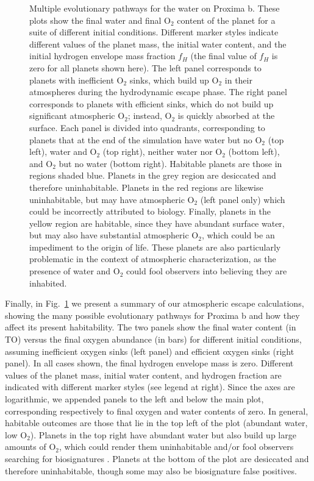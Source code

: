 \documentclass[preprint,12pt]{aastex}
\def\imagebox#1#2{\vtop to #1{\null\hbox{#2}\vfill}} %
\begin{document}
\begin{figure}
\centering
\subfigure{\label{fig:atmesc:synth:a}\imagebox{2.5in}{\texttt{[image: synth\_a.pdf]}}}
\subfigure{\label{fig:atmesc:synth:b}\imagebox{2.5in}{\texttt{[image: synth\_b.pdf]}}}
\subfigure{\label{fig:atmesc:synth:c}\imagebox{2.5in}{\texttt{[image: synth\_c.pdf]}}}
\caption{Multiple evolutionary pathways for the water on Proxima
  b. These plots show the final water and final O$_2$ content of the
  planet for a suite of different initial conditions. Different marker
  styles indicate different values of the planet mass, the initial
  water content, and the initial hydrogen envelope mass fraction $f_H$
  (the final value of $f_H$ is zero for all planets shown here).  The
  left panel corresponds to planets with inefficient O$_2$ sinks,
  which build up O$_2$ in their atmospheres during the hydrodynamic
  escape phase. The right panel corresponds to planets with efficient
  sinks, which do not build up significant atmospheric O$_2$; instead,
  O$_2$ is quickly absorbed at the surface. Each panel is divided into
  quadrants, corresponding to planets that at the end of the
  simulation have water but no O$_2$ (top left), water and O$_2$ (top
  right), neither water nor O$_2$ (bottom left), and O$_2$ but no
  water (bottom right). Habitable planets are those in regions shaded
  blue. Planets in the grey region are desiccated and therefore
  uninhabitable. Planets in the red regions are likewise
  uninhabitable, but may have atmospheric O$_2$ (left panel only)
  which could be incorrectly attributed to biology. Finally, planets
  in the yellow region are habitable, since they have abundant surface
  water, but may also have substantial atmospheric O$_2$, which could
  be an impediment to the origin of life. These planets are also
  particularly problematic in the context of atmospheric
  characterization, as the presence of water and O$_2$ could fool
  observers into believing they are inhabited.}
\label{fig:atmesc:synth}
\end{figure}

Finally, in Fig.~\ref{fig:atmesc:synth} we present a summary of our
atmospheric escape calculations, showing the many possible
evolutionary pathways for Proxima b and how they affect its present
habitability. The two panels show the final water content (in TO)
versus the final oxygen abundance (in bars) for different initial
conditions, assuming inefficient oxygen sinks (left panel) and
efficient oxygen sinks (right panel). In all cases shown, the final
hydrogen envelope mass is zero.  Different values of the planet mass,
initial water content, and hydrogen fraction are indicated with
different marker styles (see legend at right). Since the axes are
logarithmic, we appended panels to the left and below the main plot,
corresponding respectively to final oxygen and water contents of
zero. In general, habitable outcomes are those that lie in the top
left of the plot (abundant water, low O$_2$). Planets in the top right
have abundant water but also build up large amounts of O$_2$, which
could render them uninhabitable and/or fool
observers searching for biosignatures \citep{LugerBarnes15}. Planets at the bottom of the
plot are desiccated and therefore uninhabitable, though some may also
be biosignature false positives.
\end{document}
